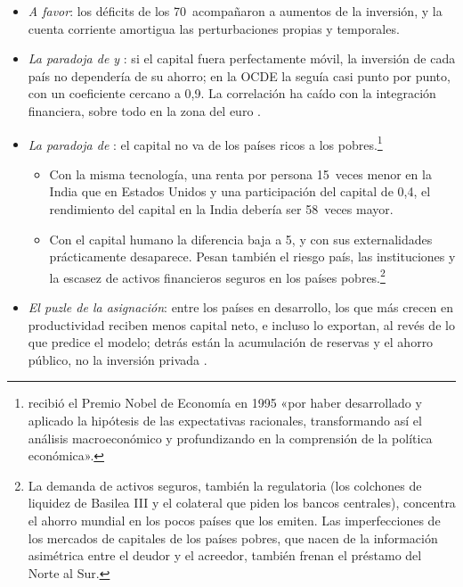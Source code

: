 \documentclass[11pt]{article}
\begin{document}
\begin{itemize}
\item \emph{A favor}: los déficits de los 70~acompañaron a aumentos de la inversión\nocite{Sachs1981}, y la cuenta corriente amortigua las perturbaciones propias y temporales\nocite{GlickRogoff1995Global}.
\item \emph{La paradoja de  y }: si el capital fuera perfectamente móvil, la inversión de cada país no dependería de su ahorro; en la OCDE la seguía casi punto por punto, con un coeficiente cercano a 0,9\nocite{FeldsteinHorioka1980}. La correlación ha caído con la integración financiera, sobre todo en la zona del euro\nocite{BlanchardGiavazzi2002} .
\item \emph{La paradoja de }: el capital no va de los países ricos a los pobres\nocite{Lucas1990Why}.\footnote{ recibió el Premio Nobel de Economía en 1995 «por haber desarrollado y aplicado la hipótesis de las expectativas racionales, transformando así el análisis macroeconómico y profundizando en la comprensión de la política económica»\nocite{NobelPrize1995Lucas}.}
  \begin{itemize}
  \item Con la misma tecnología, una renta por persona 15~veces menor en la India que en Estados Unidos y una participación del capital de 0,4, el rendimiento del capital en la India debería ser 58~veces mayor.
  \item Con el capital humano la diferencia baja a 5, y con sus externalidades prácticamente desaparece. Pesan también el riesgo país, las instituciones y la escasez de activos financieros seguros en los países pobres.\footnote{La demanda de activos seguros, también la regulatoria (los colchones de liquidez de Basilea III y el colateral que piden los bancos centrales), concentra el ahorro mundial en los pocos países que los emiten\nocite{CaballeroFarhiGourinchas2017Safe}. Las imperfecciones de los mercados de capitales de los países pobres, que nacen de la información asimétrica entre el deudor y el acreedor, también frenan el préstamo del Norte al Sur\nocite{GertlerRogoff1990}.}
  \end{itemize}
\item \emph{El puzle de la asignación}: entre los países en desarrollo, los que más crecen en productividad reciben menos capital neto, e incluso lo exportan, al revés de lo que predice el modelo; detrás están la acumulación de reservas y el ahorro público, no la inversión privada\nocite{GourinchasJeanne2013Capital} .

\end{itemize}
\end{document}
